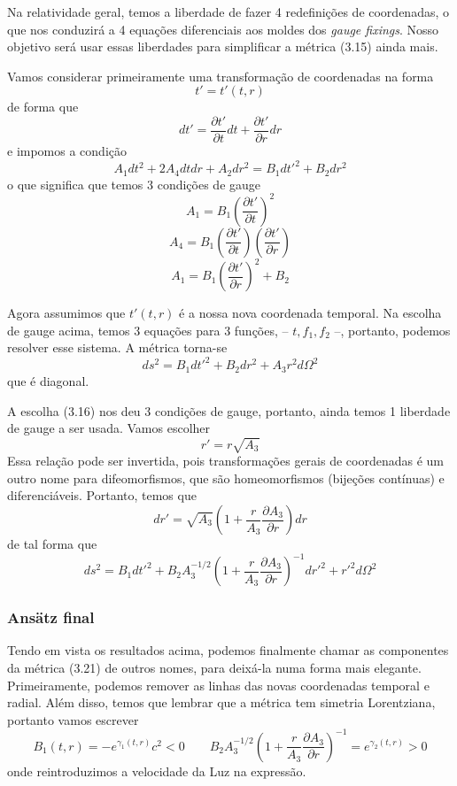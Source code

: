 \documentclass[11pt]{article}
\begin{document}
Na relatividade geral, temos a liberdade de fazer 4 redefinições de
coordenadas, o que nos conduzirá a 4 equações diferenciais aos moldes
dos \emph{gauge fixings}. Nosso objetivo será usar essas liberdades para
simplificar a métrica (3.15) ainda mais.

    Vamos considerar primeiramente uma transformação de coordenadas na forma
\[ \tag{3.16.a} t' = t'(t,r) \] de forma que
\[ \tag{3.16.b} dt' = \frac{\partial t'}{\partial t} dt +  \frac{\partial t'}{\partial r} dr \]
e impomos a condição
\[ \tag{3.17} A_1 dt^2 + 2 A_4 dt dr + A_2 dr^2 = B_1 dt'^2 + B_2 dr^2 \]
o que significa que temos 3 condições de gauge
\[ \tag{3.18.a} A_1 = B_1 \left(\frac{\partial t'}{\partial t} \right)^2  \]
\[ \tag{3.18.a} A_4 = B_1 \left(\frac{\partial t'}{\partial t} \right) \left(\frac{\partial t'}{\partial r} \right)  \]
\[ \tag{3.18.a} A_1 = B_1 \left(\frac{\partial t'}{\partial r} \right)^2 + B_2  \]

Agora assumimos que \(t'(t,r)\) é a nossa nova coordenada temporal. Na
escolha de gauge acima, temos 3 equações para 3 funções, --
\(t, f_1, f_2\) --, portanto, podemos resolver esse sistema. A métrica
torna-se
\[ \tag{3.19} ds^2 = B_1 dt'^2 + B_2 dr^2 + A_3 r^2 d \Omega^2  \] que é
diagonal.

A escolha (3.16) nos deu 3 condições de gauge, portanto, ainda temos 1
liberdade de gauge a ser usada. Vamos escolher
\[ \tag{3.20} r' = r\sqrt{A_3} \] Essa relação pode ser invertida, pois
transformações gerais de coordenadas é um outro nome para
difeomorfismos, que são homeomorfismos (bijeções contínuas) e
diferenciáveis. Portanto, temos que
\[ \tag{3.21} dr' = \sqrt{A_3}\left(1 + \frac{r}{A_3}\frac{\partial A_3}{\partial r} \right) dr\]
de tal forma que
\[ \tag{3.22} ds^2 = B_1 dt'^2 + B_2 A_3^{-1/2} \left(1 + \frac{r}{A_3}\frac{\partial A_3}{\partial r} \right)^{-1} dr'^2 + r'^2 d \Omega^2  \]

    \hypertarget{ansuxe4tz-final}{%
\subsubsection{Ansätz final}\label{ansuxe4tz-final}}

    Tendo em vista os resultados acima, podemos finalmente chamar as
componentes da métrica (3.21) de outros nomes, para deixá-la numa forma
mais elegante. Primeiramente, podemos remover as linhas das novas
coordenadas temporal e radial. Além disso, temos que lembrar que a
métrica tem simetria Lorentziana, portanto vamos escrever
\[ \tag{3.23} B_1(t,r) = - e^{\gamma_1(t,r)} c^2 < 0 \qquad 
B_2 A_3^{-1/2} \left(1 + \frac{r}{A_3}\frac{\partial A_3}{\partial r} \right)^{-1} = e^{\gamma_2(t,r)} > 0\]
onde reintroduzimos a velocidade da Luz na expressão.
\end{document}
